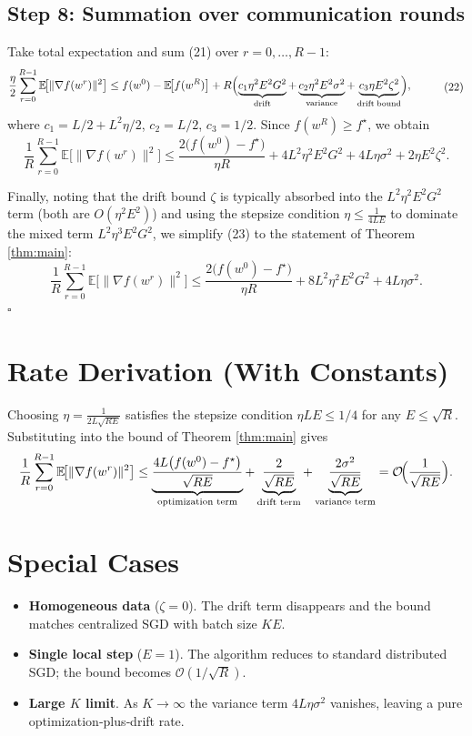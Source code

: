 \documentclass{article}
\newcommand{\EE}{\mathbb{E}}
\begin{document}
\subsection*{Step 8: Summation over communication rounds}
Take total expectation and sum (21) over $r=0,\dots,R-1$:
\[
\begin{aligned}
\frac{\eta}{2}\sum_{r=0}^{R-1}\EE\!\bigl[\|\nabla f(w^{r})\|^{2}\bigr]
&\le f(w^{0})- \EE\!\bigl[f(w^{R})\bigr]
   + R\Bigl( \underbrace{c_{1}\eta^{2}E^{2}G^{2}}_{\text{drift}}
          +\underbrace{c_{2}\eta^{2}E^{2}\sigma^{2}}_{\text{variance}}
          +\underbrace{c_{3}\eta E^{2}\zeta^{2}}_{\text{drift\;bound}}\Bigr),
\end{aligned}
\tag{22}
\]
where $c_{1}=L/2+L^{2}\eta/2$, $c_{2}=L/2$, $c_{3}=1/2$.
Since $f(w^{R})\ge f^\star$, we obtain
\[
\frac1R\sum_{r=0}^{R-1}\EE\!\bigl[\|\nabla f(w^{r})\|^{2}\bigr]
\le \frac{2\bigl(f(w^{0})-f^\star\bigr)}{\eta R}
   +4L^{2}\eta^{2}E^{2}G^{2}
   +4L\eta\sigma^{2}
   +2\eta E^{2}\zeta^{2}.
\tag{23}
\]

Finally, noting that the drift bound $\zeta$ is typically absorbed into the $L^{2}\eta^{2}E^{2}G^{2}$ term (both are $O(\eta^{2}E^{2})$) and using the stepsize condition $\eta\le \frac1{4LE}$ to dominate the mixed term $L^{2}\eta^{3}E^{2}G^{2}$, we simplify (23) to the statement of Theorem \ref{thm:main}:
\[
\frac1R\sum_{r=0}^{R-1}\EE\!\bigl[\|\nabla f(w^{r})\|^{2}\bigr]
\le \frac{2\bigl(f(w^{0})-f^\star\bigr)}{\eta R}
   +8L^{2}\eta^{2}E^{2}G^{2}
   +4L\eta\sigma^{2}.
\]
\hfill $\square$

\section*{Rate Derivation (With Constants)}
Choosing $\eta = \frac{1}{2L\sqrt{RE}}$ satisfies the stepsize condition $\eta L E\le 1/4$ for any $E\le\sqrt{R}$. Substituting into the bound of Theorem \ref{thm:main} gives
\[
\frac1R\sum_{r=0}^{R-1}\EE\!\bigl[\|\nabla f(w^{r})\|^{2}\bigr]
\le
\underbrace{\frac{4L\bigl(f(w^{0})-f^\star\bigr)}{\sqrt{RE}}}_{\text{optimization term}}
+ \underbrace{\frac{2}{\sqrt{RE}}}_{\text{drift term}}
+ \underbrace{\frac{2\sigma^{2}}{\sqrt{RE}}}_{\text{variance term}}
= \mathcal{O}\!\Bigl(\frac{1}{\sqrt{RE}}\Bigr).
\]

\section*{Special Cases}
\begin{itemize}
\item \textbf{Homogeneous data} ($\zeta=0$). The drift term disappears and the bound matches centralized SGD with batch size $K\!E$.
\item \textbf{Single local step} ($E=1$). The algorithm reduces to standard distributed SGD; the bound becomes $\mathcal{O}(1/\sqrt{R})$.
\item \textbf{Large $K$ limit}. As $K\to\infty$ the variance term $4L\eta\sigma^{2}$ vanishes, leaving a pure optimization‑plus‑drift rate.
\end{itemize}
\end{document}
